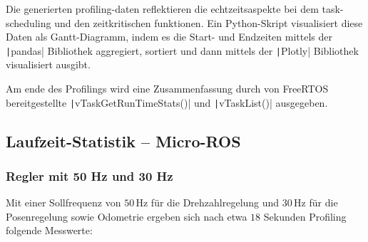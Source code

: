 Die generierten profiling-daten reflektieren die echtzeitsaspekte bei dem
task-scheduling und den zeitkritischen funktionen. Ein Python-Skript
visualisiert diese Daten als Gantt-Diagramm, indem es die Start- und Endzeiten
mittels der \texttt|pandas| Bibliothek aggregiert, sortiert und dann
mittels der \texttt|Plotly| Bibliothek visualisiert ausgibt.

Am ende des Profilings wird eine Zusammenfassung durch von FreeRTOS
bereitgestellte \texttt|vTaskGetRunTimeStats()| und
\texttt|vTaskList()| ausgegeben.

\subsection{Laufzeit-Statistik -- Micro-ROS}

\subsubsection{Regler mit 50 Hz und 30 Hz}

Mit einer Sollfrequenz von $50\,\text{Hz}$ für die Drehzahlregelung und $30\,\text{Hz}$ für
die Posenregelung sowie Odometrie ergeben sich nach etwa $18$ Sekunden Profiling
folgende Messwerte:

